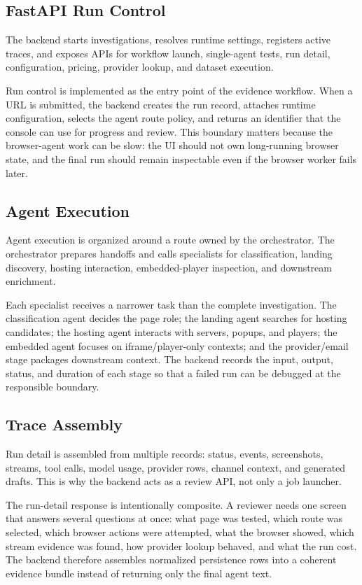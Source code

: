 \subsection{FastAPI Run Control}

The backend starts investigations, resolves runtime settings, registers active
traces, and exposes APIs for workflow launch, single-agent tests, run detail,
configuration, pricing, provider lookup, and dataset execution.

Run control is implemented as the entry point of the evidence workflow. When a
URL is submitted, the backend creates the run record, attaches runtime
configuration, selects the agent route policy, and returns an identifier that
the console can use for progress and review. This boundary matters because the
browser-agent work can be slow: the UI should not own long-running browser
state, and the final run should remain inspectable even if the browser worker
fails later.

\subsection{Agent Execution}

Agent execution is organized around a route owned by the orchestrator. The
orchestrator prepares handoffs and calls specialists for classification,
landing discovery, hosting interaction, embedded-player inspection, and
downstream enrichment.

Each specialist receives a narrower task than the complete investigation. The
classification agent decides the page role; the landing agent searches for
hosting candidates; the hosting agent interacts with servers, popups, and
players; the embedded agent focuses on iframe/player-only contexts; and the
provider/email stage packages downstream context. The backend records the
input, output, status, and duration of each stage so that a failed run can be
debugged at the responsible boundary.

\subsection{Trace Assembly}

Run detail is assembled from multiple records: status, events, screenshots,
streams, tool calls, model usage, provider rows, channel context, and generated
drafts. This is why the backend acts as a review API, not only a job launcher.

The run-detail response is intentionally composite. A reviewer needs one screen
that answers several questions at once: what page was tested, which route was
selected, which browser actions were attempted, what the browser showed, which
stream evidence was found, how provider lookup behaved, and what the run cost.
The backend therefore assembles normalized persistence rows into a coherent
evidence bundle instead of returning only the final agent text.

